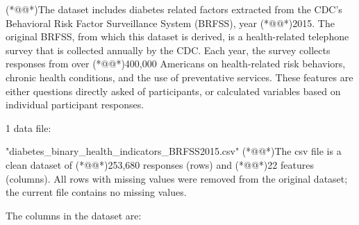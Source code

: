 \documentclass[11pt]{article}
\begin{document}
\begin{codeoutput}
(*@@*)The dataset includes diabetes related factors extracted from the CDC's Behavioral Risk Factor Surveillance System (BRFSS), year (*@@*)2015.
The original BRFSS, from which this dataset is derived, is a health-related telephone survey that is collected annually by the CDC.
Each year, the survey collects responses from over (*@@*)400,000 Americans on health-related risk behaviors, chronic health conditions, and the use of preventative services. These features are either questions directly asked of participants, or calculated variables based on individual participant responses.


1 data file:

"diabetes_binary_health_indicators_BRFSS2015.csv"
(*@@*)The csv file is a clean dataset of (*@@*)253,680 responses (rows) and (*@@*)22 features (columns).
All rows with missing values were removed from the original dataset; the current file contains no missing values.

The columns in the dataset are:


\end{codeoutput}
\end{document}
